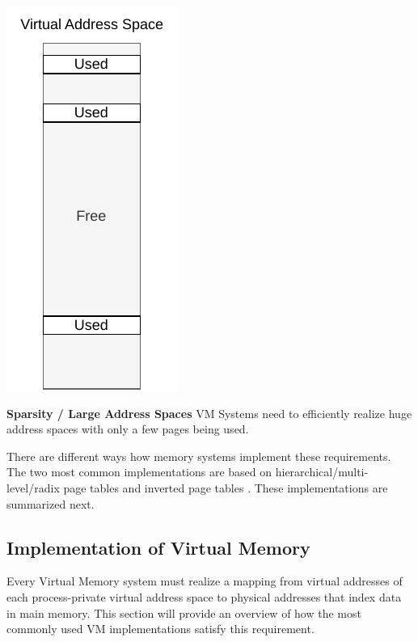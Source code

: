 \begin{marginfigure}
    \centering
    \includegraphics*[width=0.5\marginparwidth]{figures/fund_sparsity.pdf}
    \caption{\textbf{Sparsity / Large Address Spaces} VM Systems need to efficiently
        realize huge address spaces with only a few pages being used.}
\end{marginfigure}


There are different ways how memory systems implement these requirements.
The two most common implementations are based on hierarchical/multi-level/radix
\cite{jacob1998virtualissues,yaniv2016hash,tanenbaumOS} page tables and inverted page tables \cite{jacob1998look,jacob1998virtualissues}.
These implementations are summarized next.





\subsection{Implementation of Virtual Memory}
Every Virtual Memory system must realize a mapping from virtual addresses of each process-private virtual address space to physical addresses that index data in main memory.
This section will provide an overview of how the most commonly used VM implementations satisfy
this requirement.


